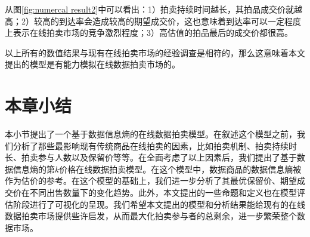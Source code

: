 从图\ref{fig:numercal result2}中可以看出：1）拍卖持续时间越长，其拍品成交价就越高；2）较高的到达率会造成较高的期望成交价，这也意味着到达率可以一定程度上表示在线拍卖市场的竞争激烈程度；3）高估值的拍品最后的成交价都很高。

以上所有的数值结果与现有在线拍卖市场的经验调查是相符的，那么这意味着本文提出的模型是有能力模拟在线数据拍卖市场的。

\section{本章小结}

本小节提出了一个基于数据信息熵的在线数据拍卖模型。在叙述这个模型之前，我们分析了那些最影响现有传统商品在线拍卖的因素，比如拍卖机制、拍卖持续时长、拍卖参与人数以及保留价等等。在全面考虑了以上因素后，我们提出了基于数据信息熵的第$k$价格在线数据拍卖模型。在这个模型中，数据商品的数据信息熵被作为估价的参考。在这个模型的基础上，我们进一步分析了其最优保留价、期望成交价在不同出售数量下的变化趋势。此外，本文提出的一些命题和定义也在模型评估阶段进行了可视化的呈现。我们希望本文提出的模型和分析结果能给现有的在线数据拍卖市场提供些许启发，从而最大化拍卖参与者的总剩余，进一步繁荣整个数据市场。